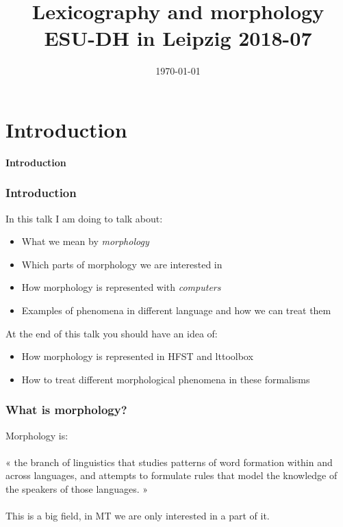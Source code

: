 \documentclass[10pt,xetex]{beamer} %
\date{\today}
\title{Lexicography and morphology
    \scriptsize{ESU-DH in Leipzig 2018-07}}
\begin{document}
\section{Introduction}

\begin{frame} %
 \begin{center}
 {\Large {\bf Introduction}}  %
 \end{center}
\end{frame}

\begin{frame}
  \frametitle{Introduction}

In this talk I am doing to talk about:

\begin{itemize}
  \item What we mean by {\em morphology}
  \item Which parts of morphology we are interested in
  \item How morphology is represented with {\em computers}
  \item Examples of phenomena in different language and how we can treat them
\end{itemize}

At the end of this talk you should have an idea of:

\begin{itemize}
  \item How morphology is represented in HFST and lttoolbox
  \item How to treat different morphological phenomena in these formalisms
\end{itemize}

\end{frame}

\begin{frame}
  \frametitle{What is morphology?}

Morphology is: ~\\
~\\

 « the branch of linguistics that studies patterns of word formation within and
 across languages, and attempts to formulate rules that model the knowledge
 of the speakers of those languages. »\\
~\\

This is a big field, in MT we are only interested in a part of it.

\end{frame}
\end{document}
